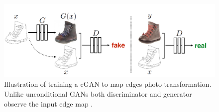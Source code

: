 \begin{figure}[H]
        \begin{center}
 	    \includegraphics[scale=0.30]{images/relatedWorks/CGAN.png}
	    \caption[Illustration of training a \ac{cGAN} to map edges \textrightarrow photo transformation.]{Illustration of training a \ac{cGAN} to map edges \textrightarrow photo transformation. Unlike unconditional \acp{GAN} both discriminator and generator observe the input edge map \cite{isola2018imagetoimage}.}
	    \label{fig:CGAN}
	    \end{center}
\end{figure}




